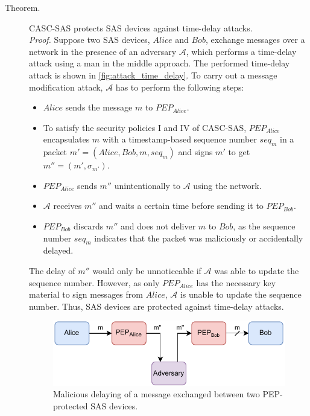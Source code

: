 \begin{description}
    \item[Theorem.] CASC-SAS protects SAS devices against time-delay attacks.\\
    \textit{Proof.} Suppose two SAS devices, $Alice$ and $Bob$, exchange messages over a network in the presence of an adversary $\mathcal{A}$, which performs a time-delay attack using a man in the middle approach.
    The performed time-delay attack is shown in \autoref{fig:attack_time_delay}.
    To carry out a message modification attack, $\mathcal{A}$ has to perform the following steps:
    \begin{itemize}
        \item $Alice$ sends the message $m$ to $PEP_{Alice}$.
        \item To satisfy the security policies I and IV of CASC-SAS, $PEP_{Alice}$ encapsulates $m$ with a timestamp-based sequence number $seq_m$ in a packet $m' = (Alice, Bob, m, seq_m)$ and signs $m'$ to get $m'' = (m', \sigma_{m'})$.
        \item $PEP_{Alice}$ sends $m''$ unintentionally to $\mathcal{A}$ using the network.
        \item $\mathcal{A}$ receives $m''$ and waits a certain time before sending it to $PEP_{Bob}$.
        \item $PEP_{Bob}$ discards $m''$ and does not deliver $m$ to $Bob$, as the sequence number $seq_m$ indicates that the packet was maliciously or accidentally delayed.
    \end{itemize}
    The delay of $m''$ would only be unnoticeable if $\mathcal{A}$ was able to update the sequence number.
    However, as only $PEP_{Alice}$ has the necessary key material to sign messages from $Alice$, $\mathcal{A}$ is unable to update the sequence number.
    Thus, SAS devices are protected against time-delay attacks.
    \begin{figure}
        \centering
        \includegraphics[width=0.75\linewidth]{figures/attack_time_delay.drawio.pdf}
        \caption{Malicious delaying of a message exchanged between two PEP-protected SAS devices.}
        \label{fig:attack_time_delay}
    \end{figure}
\end{description}

